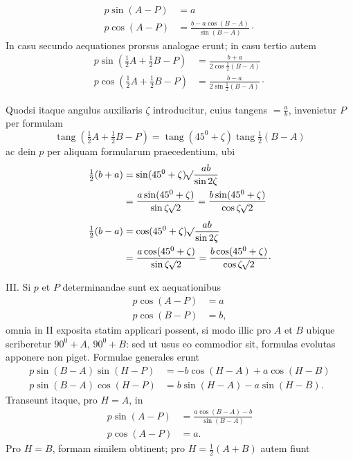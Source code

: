 \[
\begin{aligned}
p\sin(A-P)&=a\\
p\cos(A-P)&=\frac{b-a\cos(B-A)}{\sin(B-A)}\mathpunct{\cdot}
\end{aligned}
\]
In casu secundo aequationes prorsus analogae erunt; in casu tertio autem
\[
\begin{aligned}
p\sin(\tfrac{1}{2}A+\tfrac{1}{2}B-P)&=\frac{b+a}{2\cos\tfrac{1}{2}(B-A)}\\
p\cos(\tfrac{1}{2}A+\tfrac{1}{2}B-P)&=\frac{b-a}{2\sin\tfrac{1}{2}(B-A)}\mathpunct{\cdot}
\end{aligned}
\]
\par
Quodsi itaque angulus auxiliaris $\zeta$ introducitur, cuius tangens $=\frac{a}{b}$, invenietur $P$ per formulam
\[
\operatorname{tang}(\tfrac{1}{2}A+\tfrac{1}{2}B-P)=\operatorname{tang}(45^0+\zeta)\operatorname{tang}\tfrac{1}{2}(B-A)
\]
ac dein $p$ per aliquam formularum praecedentium, ubi
\[
\begin{aligned}
\tfrac{1}{2}(b+a)&=\sin(45^0+\zeta)\mathord{{}^{}\!\surd}\frac{ab}{\sin2\zeta}\\
&=\frac{a\sin(45^0+\zeta)}{\sin\zeta\mathord{{}^{}\!\surd}2}=\frac{b\sin(45^0+\zeta)}{\cos\zeta\mathord{{}^{}\!\surd}2}\\[.4em]
\tfrac{1}{2}(b-a)&=\cos(45^0+\zeta)\mathord{{}^{}\!\surd}\frac{ab}{\sin2\zeta}\\
&=\frac{a\cos(45^0+\zeta)}{\sin\zeta\mathord{{}^{}\!\surd}2}=\frac{b\cos(45^0+\zeta)}{\cos\zeta\mathord{{}^{}\!\surd}2}\mathpunct{\cdot}
\end{aligned}
\]
\par
III. Si $p$ et $P$ determinandae sunt ex aequationibus
\[
\begin{aligned}
p\cos(A-P)&=a\\
p\cos(B-P)&=b,
\end{aligned}
\]
omnia in II exposita statim applicari possent, si modo illic pro $A$ et $B$ ubique scriberetur $90^0+A$, $90^0+B$: sed ut usus eo commodior sit, formulas evolutas apponere non piget. Formulae generales erunt
\[
\begin{aligned}
p\sin(B-A)\sin(H-P)&=-b\cos(H-A)+a\cos(H-B)\\
p\sin(B-A)\cos(H-P)&=b\sin(H-A)-a\sin(H-B).
\end{aligned}
\]
Transeunt itaque, pro $H=A$, in
\[
\begin{aligned}
p\sin(A-P)&=\frac{a\cos(B-A)-b}{\sin(B-A)}\\
p\cos(A-P)&=a.
\end{aligned}
\]
Pro $H=B$, formam similem obtinent; pro $H=\tfrac{1}{2}(A+B)$ autem fiunt
